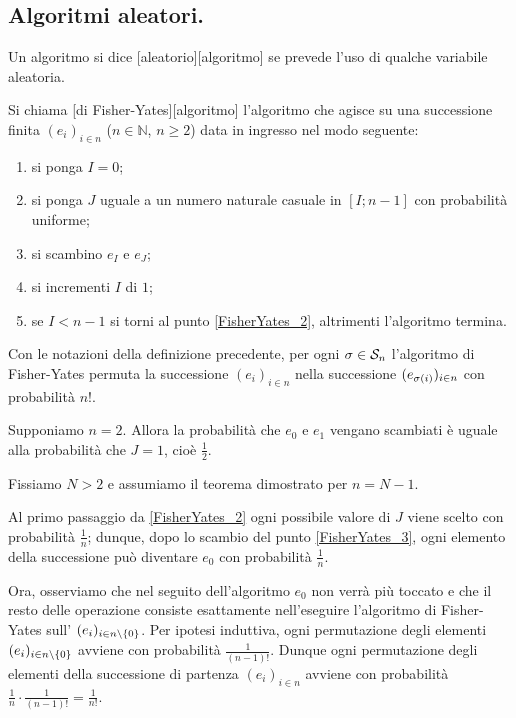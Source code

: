 \subsection{Algoritmi aleatori.}
\label{AlgoritmiEStruttureDiDati_AlgoritmiAleatori}
\begin{Definition}
  Un algoritmo si dice [aleatorio][algoritmo] se prevede
  l'uso di qualche variabile aleatoria.
\end{Definition}
\begin{Definition}
  Si chiama [di Fisher-Yates][algoritmo]
  l'algoritmo che agisce su una successione finita
  $(e_i)_{i \in n}$ ($n \in \mathbb{N}$, $n \geq 2$)
  data in ingresso nel modo seguente:
  \begin{enumerate}
    \item\label{FisherYates_1} si ponga $I = 0$;
    \item\label{FisherYates_2} si ponga $J$ uguale a un numero naturale casuale
      in $[I;n - 1]$ con probabilit\`a uniforme;
    \item\label{FisherYates_3} si scambino $e_I$ e $e_J$;
    \item\label{FisherYates_5} si incrementi $I$ di $1$;
    \item\label{FisherYates_4} se $I < n - 1$ si
      torni al punto \ref{FisherYates_2}, altrimenti l'algoritmo termina.
  \end{enumerate}
\end{Definition}
\begin{Theorem}
  Con le notazioni della definizione precedente,
  per ogni
  $\Permutation \in \SymmetricGroup{n}$
  l'algoritmo di Fisher-Yates permuta la successione
  $(e_i)_{i \in n}$
  nella successione
  $(e_{\Permutation(i)})_{i \in n}$
  con probabilit\`a
  $n!$.
\end{Theorem}
\Proof Supponiamo $n = 2$. Allora la probabilit\`a che $e_0$ e $e_1$ vengano
scambiati \`e uguale alla probabilit\`a che $J = 1$, cio\`e $\frac{1}{2}$.
\par Fissiamo $N > 2$ e assumiamo il teorema dimostrato per $n = N - 1$.
\par Al primo passaggio da \ref{FisherYates_2} ogni possibile valore di $J$
viene scelto con probabilit\`a $\frac{1}{n}$; dunque, dopo lo scambio del punto
\ref{FisherYates_3}, ogni elemento della successione pu\`o diventare $e_0$ con
probabilit\`a $\frac{1}{n}$.
\par Ora, osserviamo che nel seguito dell'algoritmo $e_0$ non verr\`a pi\`u
toccato e che il resto delle operazione consiste esattamente nell'eseguire
l'algoritmo di Fisher-Yates sull' $(e_i)_{i \in n \setminus \lbrace 0 \rbrace}$.
Per ipotesi induttiva, ogni permutazione degli elementi
$(e_i)_{i \in n \setminus \lbrace 0 \rbrace}$ avviene con probabilit\`a $\frac{1}{(n - 1)!}$.
Dunque ogni permutazione degli elementi della successione di partenza
$(e_i)_{i \in n}$ avviene con probabilit\`a
$\frac{1}{n} \cdot \frac{1}{(n - 1)!} = \frac{1}{n!}$. \EndProof
